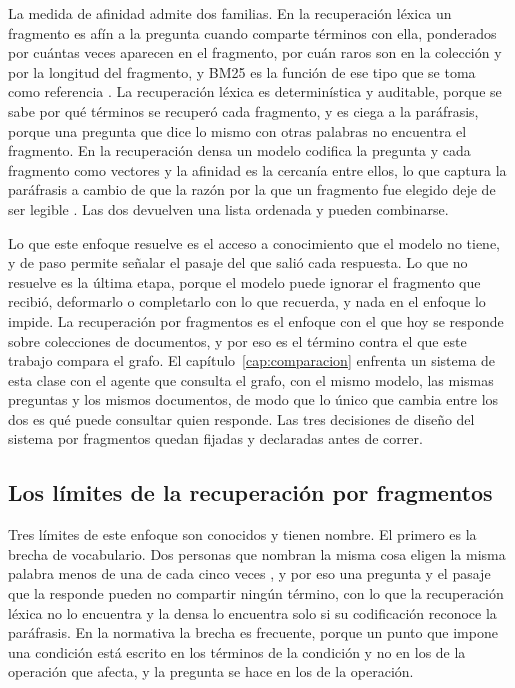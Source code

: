 \documentclass[12pt,a4paper]{report}
\begin{document}
La medida de afinidad admite dos familias. En la recuperación léxica un fragmento es afín a la pregunta cuando comparte términos con ella, ponderados por cuántas veces aparecen en el fragmento, por cuán raros son en la colección y por la longitud del fragmento, y BM25 es la función de ese tipo que se toma como referencia \cite{robertson2009bm25}. La recuperación léxica es determinística y auditable, porque se sabe por qué términos se recuperó cada fragmento, y es ciega a la paráfrasis, porque una pregunta que dice lo mismo con otras palabras no encuentra el fragmento. En la recuperación densa un modelo codifica la pregunta y cada fragmento como vectores y la afinidad es la cercanía entre ellos, lo que captura la paráfrasis a cambio de que la razón por la que un fragmento fue elegido deje de ser legible \cite{karpukhin2020dpr}. Las dos devuelven una lista ordenada y pueden combinarse.

Lo que este enfoque resuelve es el acceso a conocimiento que el modelo no tiene, y de paso permite señalar el pasaje del que salió cada respuesta. Lo que no resuelve es la última etapa, porque el modelo puede ignorar el fragmento que recibió, deformarlo o completarlo con lo que recuerda, y nada en el enfoque lo impide. La recuperación por fragmentos es el enfoque con el que hoy se responde sobre colecciones de documentos, y por eso es el término contra el que este trabajo compara el grafo. El capítulo~\ref{cap:comparacion} enfrenta un sistema de esta clase con el agente que consulta el grafo, con el mismo modelo, las mismas preguntas y los mismos documentos, de modo que lo único que cambia entre los dos es qué puede consultar quien responde. Las tres decisiones de diseño del sistema por fragmentos quedan fijadas y declaradas antes de correr.

\subsection{Los límites de la recuperación por fragmentos}

Tres límites de este enfoque son conocidos y tienen nombre. El primero es la brecha de vocabulario. Dos personas que nombran la misma cosa eligen la misma palabra menos de una de cada cinco veces \cite{furnas1987vocabulary}, y por eso una pregunta y el pasaje que la responde pueden no compartir ningún término, con lo que la recuperación léxica no lo encuentra y la densa lo encuentra solo si su codificación reconoce la paráfrasis. En la normativa la brecha es frecuente, porque un punto que impone una condición está escrito en los términos de la condición y no en los de la operación que afecta, y la pregunta se hace en los de la operación.
\end{document}
